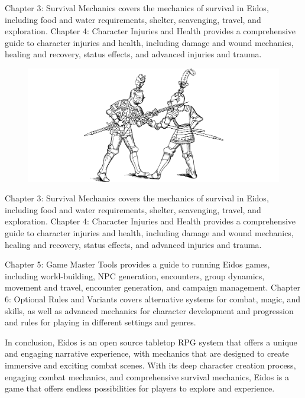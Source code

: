 \documentclass[12pt]{book}  %
\begin{document}
Chapter 3: Survival Mechanics covers the mechanics of survival in Eidos, including food and water requirements, shelter, scavenging, travel, and exploration. Chapter 4: Character Injuries and Health provides a comprehensive guide to character injuries and health, including damage and wound mechanics, healing and recovery, status effects, and advanced injuries and trauma.

\begin{figure}[h]
    \centering
    \includegraphics[width=\textwidth]{./images/presentation02.pdf}
\end{figure}

Chapter 3: Survival Mechanics covers the mechanics of survival in Eidos, including food and water requirements, shelter, scavenging, travel, and exploration. Chapter 4: Character Injuries and Health provides a comprehensive guide to character injuries and health, including damage and wound mechanics, healing and recovery, status effects, and advanced injuries and trauma.

Chapter 5: Game Master Tools provides a guide to running Eidos games, including world-building, NPC generation, encounters, group dynamics, movement and travel, encounter generation, and campaign management. Chapter 6: Optional Rules and Variants covers alternative systems for combat, magic, and skills, as well as advanced mechanics for character development and progression and rules for playing in different settings and genres.

In conclusion, Eidos is an open source tabletop RPG system that offers a unique and engaging narrative experience, with mechanics that are designed to create immersive and exciting combat scenes. With its deep character creation process, engaging combat mechanics, and comprehensive survival mechanics, Eidos is a game that offers endless possibilities for players to explore and experience.
\end{document}

